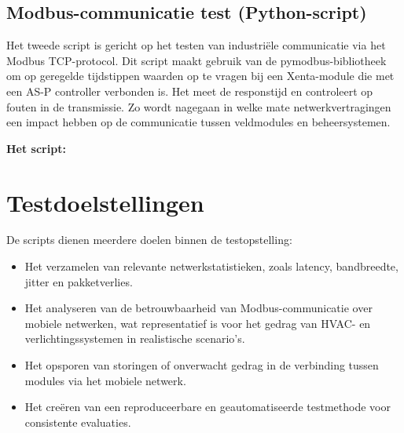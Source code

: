 \subsection*{Modbus-communicatie test (Python-script)}

Het tweede script is gericht op het testen van industriële communicatie via het Modbus TCP-protocol. Dit script maakt gebruik van de pymodbus-bibliotheek om op geregelde tijdstippen waarden op te vragen bij een Xenta-module die met een AS-P controller verbonden is. Het meet de responstijd en controleert op fouten in de transmissie. Zo wordt nagegaan in welke mate netwerkvertragingen een impact hebben op de communicatie tussen veldmodules en beheersystemen.

\textbf{Het script:}
%    
%    

\section{Testdoelstellingen}

De scripts dienen meerdere doelen binnen de testopstelling:
\begin{itemize}
    \item Het verzamelen van relevante netwerkstatistieken, zoals latency, bandbreedte, jitter en pakketverlies.
    \item Het analyseren van de betrouwbaarheid van Modbus-communicatie over mobiele netwerken, wat representatief is voor het gedrag van HVAC- en verlichtingssystemen in realistische scenario’s.
    \item Het opsporen van storingen of onverwacht gedrag in de verbinding tussen modules via het mobiele netwerk.
    \item Het creëren van een reproduceerbare en geautomatiseerde testmethode voor consistente evaluaties.
\end{itemize}

